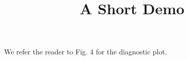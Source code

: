 \documentclass[article]{jss}
\title{A Short Demo}
\begin{document}
We refer the reader to Fig. 4 for the diagnostic plot.
\end{document}
